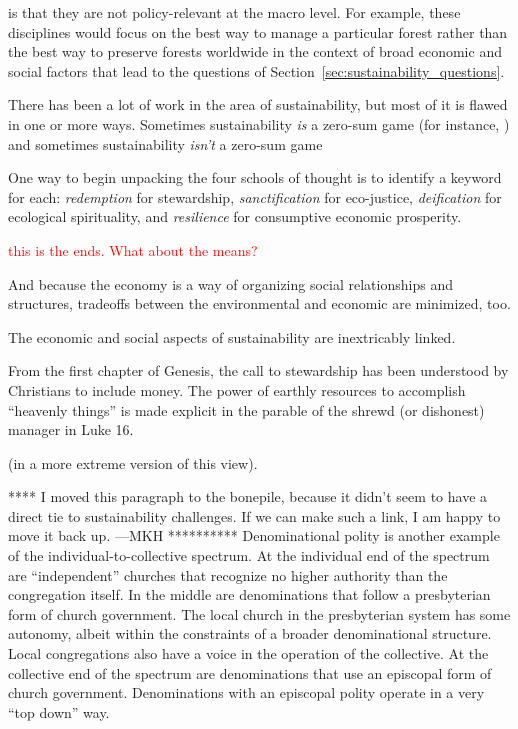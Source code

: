 \documentclass[12pt]{article}
\newcommand{\ins}[1]{\textcolor{red}{#1}}
\begin{document}
is that they are not policy-relevant
at the macro level. 
For example, these disciplines would focus on the best way to manage a particular forest 
rather than the best way to preserve forests worldwide
in the context of broad economic and social factors
that lead to the questions of Section~\ref{sec:sustainability_questions}.

There has been a lot of work in the area of sustainability, but most of it is flawed in one or more ways.
Sometimes sustainability \emph{is} a zero-sum game 
(for instance, )
and sometimes sustainability \emph{isn't} a zero-sum game 



One way to begin unpacking the four schools of thought 
is to identify a keyword for each:
\emph{redemption} for stewardship, 
\emph{sanctification} for eco-justice,
\emph{deification} for ecological spirituality, and
\emph{resilience} for consumptive economic prosperity.



\ins{this is the ends. What about the means?}

And because the economy is a way of organizing social relationships and structures,
tradeoffs between the environmental and economic are minimized, too.


The economic and social aspects of sustainability are inextricably linked. 

From the first chapter of Genesis, the call to stewardship has
been understood by Christians to include money. 
The power of earthly resources to accomplish ``heavenly things'' is made
explicit in the parable of the shrewd (or dishonest) manager in Luke 16. 

 (in a more extreme version of this view).



**** I moved this paragraph to the bonepile, because it didn't seem to have a direct tie
to sustainability challenges. 
If we can make such a link, I am happy to move it back up.
---MKH **********
 Denominational polity is another example of the individual-to-collective spectrum.
At the individual end of the spectrum are ``independent'' churches 
that recognize no higher authority than the congregation itself.
In the middle are denominations that follow a presbyterian form of church government. 
The local church in the presbyterian system has some autonomy, 
albeit within the constraints of a broader denominational structure. 
Local congregations also have a voice in the operation of the collective. 
At the collective end of the spectrum are denominations that use 
an episcopal form of church government. 
Denominations with an episcopal polity operate in a very ``top down'' way.
\end{document}
